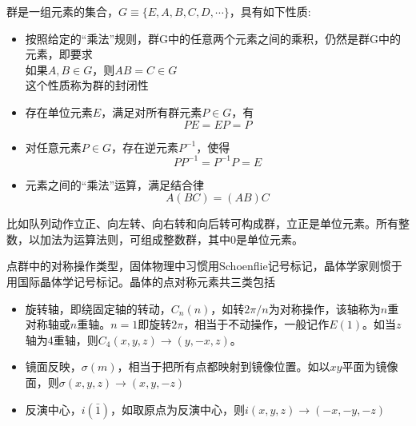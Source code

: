 群是一组元素的集合，$G\equiv\{E,A,B,C,D,\cdots\}$，具有如下性质:
\begin{itemize}
	\item 按照给定的``乘法''规则，群G中的任意两个元素之间的乘积，仍然是群G中的元素，即要求\\如果$A,B\in G$，则$AB=C\in G$\\
		这个性质称为群的封闭性
	\item 存在单位元素$E$，满足对所有群元素$P\in G$，有
		\begin{displaymath}
			PE=EP=P
		\end{displaymath}
	\item 对任意元素$P\in G$，存在逆元素$P^{-1}$，使得
		\begin{displaymath}
			PP^{-1}=P^{-1}P=E
		\end{displaymath}
	\item 元素之间的``乘法''运算，满足结合律
		\begin{displaymath}
			A(BC)=(AB)C
		\end{displaymath}
\end{itemize}
比如队列动作立正、向左转、向右转和向后转可构成群，立正是单位元素。所有整数，以加法为运算法则，可组成整数群，其中0是单位元素。

点群中的对称操作类型，固体物理中习惯用Schoenflie记号标记，晶体学家则惯于用国际晶体学记号标记。晶体的点对称元素共三类包括
\begin{itemize}
	\item 旋转轴，即绕固定轴的转动，$C_n(n)$，如转$2\pi/n$为对称操作，该轴称为$n$重对称轴或$n$重轴。$n=1$即旋转$2\pi$，相当于不动操作，一般记作$E(1)$。如当$z$轴为4重轴，则$C_4(x,y,z)\rightarrow(y,-x,z)$。
	\item 镜面反映，$\sigma(m)$，相当于把所有点都映射到镜像位置。如以$xy$平面为镜像面，则$\sigma(x,y,z)\rightarrow(x,y,-z)$
	\item 反演中心，$i(\bar{1})$，如取原点为反演中心，则$i(x,y,z)\rightarrow(-x,-y,-z)$
\end{itemize}

